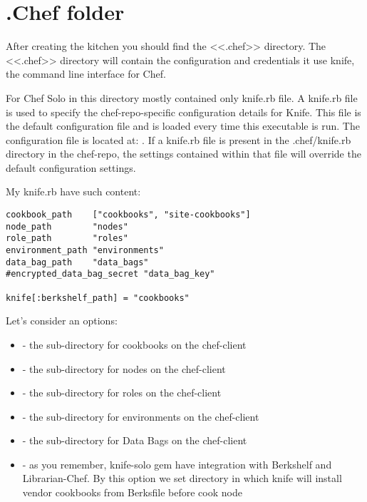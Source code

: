 \section{.Chef folder}\label{sec:solo-chef-folder}

After creating the kitchen you should find the <<.chef>> directory. The <<.chef>> directory will contain the configuration and credentials it use knife, the command line interface for Chef.

For Chef Solo in this directory mostly contained only knife.rb file. A knife.rb file is used to specify the chef-repo-specific configuration details for Knife. This file is the default configuration file and is loaded every time this executable is run. The configuration file is located at: . If a knife.rb file is present in the .chef/knife.rb directory in the chef-repo, the settings contained within that file will override the default configuration settings.

My knife.rb have such content:

\begin{lstlisting}[label=lst:my-cloud-chef-filder1,title=my-cloud/.chef/knife.rb]
cookbook_path    ["cookbooks", "site-cookbooks"]
node_path        "nodes"
role_path        "roles"
environment_path "environments"
data_bag_path    "data_bags"
#encrypted_data_bag_secret "data_bag_key"

knife[:berkshelf_path] = "cookbooks"
\end{lstlisting}

Let's consider an options:

\begin{itemize}
  \item {} - the sub-directory for cookbooks on the chef-client
  \item {} - the sub-directory for nodes on the chef-client
  \item {} - the sub-directory for roles on the chef-client
  \item {} - the sub-directory for environments on the chef-client
  \item {} - the sub-directory for Data Bags on the chef-client
  \item {} - as you remember, knife-solo gem have integration with Berkshelf and Librarian-Chef. By this option we set directory in which knife will install vendor cookbooks from Berksfile before cook node
\end{itemize}
